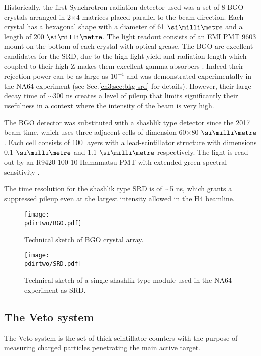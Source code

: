 Historically, the first Synchrotron radiation detector used was a set of 8 BGO crystals arranged in 2$\times$4 matrices placed parallel to the beam direction. Each crystal has a hexagonal shape with a diameter of 61 $\mmi$ and a length of 200 $\mmi$. The light readout consists of an EMI PMT 9603 mount on the bottom of each crystal with optical grease. The BGO are excellent candidates for the SRD, due to the high light-yield and radiation length which coupled to their high Z makes them excellent gamma-absorbers \cite{bgo-crystal}. Indeed their rejection power can be as large as $10^{-4}$ and was demonstrated experimentally in the NA64 experiment (see Sec.\ref{ch3:sec:bkg-srd} for details). However, their large decay time of $\sim$300 \si{ns} creates a level of pileup that limits significantly their usefulness in a context where the intensity of the beam is very high.

The BGO detector was substituted with a shashlik type detector since the 2017 beam time, which uses three adjacent cells of dimension 60$\times$80 $\mmi$. Each cell consists of 100 layers with a lead-scintillator structure with dimensions 0.1 $\mmi$ and 1.1 $\mmi$ respectively. The light is read out by an R9420-100-10 Hamamatsu PMT with extended green spectral sensitivity \cite{hamamatsu-R9420-100-10}.

The time resolution for the shashlik type SRD is of $\sim$5 \si{ns}, which grants a suppressed pileup even at the largest intensity allowed in the H4 beamline.

\begin{figure}[bth!]
\centering
\texttt{[image: \\pdirtwo/BGO.pdf]}
\caption[BGO sketch]{Technical sketch of BGO crystal array.}
\label{fig:bgo-sketch}
\end{figure}

\begin{figure}[bth!]
\centering
\texttt{[image: \\pdirtwo/SRD.pdf]}
\caption[SRD sketch]{Technical sketch of a single shashlik type module used in the NA64 experiment as SRD.}
\label{fig:srd-sketch}
\end{figure}

\subsection{The Veto system}
\label{ch2:sec:detectors-veto}

The Veto system is the set of thick scintillator counters with the purpose of measuring charged particles penetrating the main active target.

